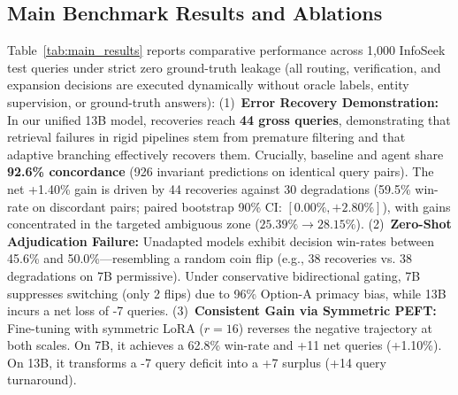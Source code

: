 \documentclass[conference]{IEEEtran}
\begin{document}
\subsection{Main Benchmark Results and Ablations}
Table~\ref{tab:main_results} reports comparative performance across 1,000 InfoSeek test queries under strict zero ground-truth leakage (all routing, verification, and expansion decisions are executed dynamically without oracle labels, entity supervision, or ground-truth answers):
(1)~\textbf{Error Recovery Demonstration:} In our unified 13B model, recoveries reach \textbf{44 gross queries}, demonstrating that retrieval failures in rigid pipelines stem from premature filtering and that adaptive branching effectively recovers them. Crucially, baseline and agent share \textbf{92.6\% concordance} (926 invariant predictions on identical query pairs). The net +1.40\% gain is driven by 44 recoveries against 30 degradations (59.5\% win-rate on discordant pairs; paired bootstrap 90\% CI: $[0.00\%, +2.80\%]$), with gains concentrated in the targeted ambiguous zone ($25.39\% \to 28.15\%$).
(2)~\textbf{Zero-Shot Adjudication Failure:} Unadapted models exhibit decision win-rates between 45.6\% and 50.0\%---resembling a random coin flip (e.g., 38 recoveries vs. 38 degradations on 7B permissive). Under conservative bidirectional gating, 7B suppresses switching (only 2 flips) due to 96\% Option-A primacy bias, while 13B incurs a net loss of -7 queries.
(3)~\textbf{Consistent Gain via Symmetric PEFT:} Fine-tuning with symmetric LoRA ($r=16$) reverses the negative trajectory at both scales. On 7B, it achieves a 62.8\% win-rate and +11 net queries (+1.10\%). On 13B, it transforms a -7 query deficit into a +7 surplus (+14 query turnaround).
\end{document}
